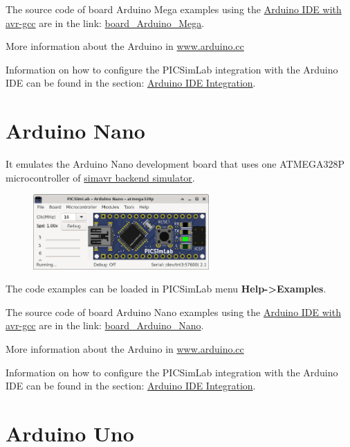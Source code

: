 The source code of board Arduino Mega examples using the 
\href{https://www.arduino.cc/en/Main/Software}{Arduino IDE with avr-gcc} are in the link: 
\href{https://lcgamboa.github.io/picsimlab_examples/board_Arduino_Mega.html}{board\_Arduino\_Mega}.

More information about the Arduino in \href{https://www.arduino.cc/}{www.arduino.cc}

Information on how to configure the PICSimLab integration with the Arduino IDE can be found in the 
section: \hyperlink{def:arduinoide}{Arduino IDE Integration}.

\section{Arduino Nano}

It emulates the Arduino Nano development board that uses one ATMEGA328P microcontroller of
\hyperlink{def:simavr}{simavr backend simulator}.

\begin{figure}[H]
\center
\includegraphics[width=0.60\textwidth]{img/boardANano.png} 
\end{figure} 


The code examples can be loaded in PICSimLab menu \textbf{Help->Examples}.

The source code of board Arduino Nano examples using the 
\href{https://www.arduino.cc/en/Main/Software}{Arduino IDE with avr-gcc} are in the link: 
\href{https://lcgamboa.github.io/picsimlab_examples/board_Arduino_Nano.html}{board\_Arduino\_Nano}.

More information about the Arduino in \href{https://www.arduino.cc/}{www.arduino.cc}

Information on how to configure the PICSimLab integration with the Arduino IDE can be found in the 
section: \hyperlink{def:arduinoide}{Arduino IDE Integration}.

\section{Arduino Uno}

